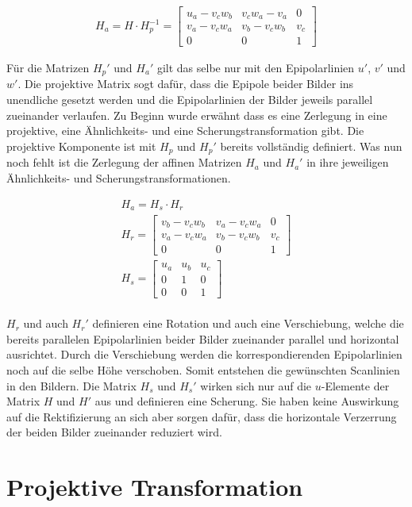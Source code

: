 \begin{gather}
	H_a= H \cdot H^{-1}_p = 
	\begin{bmatrix}
	u_a-v_cw_b&v_cw_a-v_a&0\\
	v_a-v_cw_a&v_b-v_cw_b&v_c\\
	0&0&1
	\end{bmatrix}
\end{gather}

Für die Matrizen $H_p'$ und $H_a'$ gilt das selbe nur mit den Epipolarlinien $u'$, $v'$ und $w'$.
Die projektive Matrix sogt dafür, dass die Epipole beider Bilder ins unendliche gesetzt werden und die Epipolarlinien der Bilder jeweils parallel zueinander verlaufen. Zu Beginn wurde erwähnt dass es eine Zerlegung in eine projektive, eine Ähnlichkeits- und eine Scherungstransformation gibt. Die projektive Komponente ist mit $H_p$ und $H_p'$ bereits vollständig definiert. Was nun noch fehlt ist die Zerlegung der affinen Matrizen $H_a$ und $H_a'$ in ihre jeweiligen Ähnlichkeits- und Scherungstransformationen. 

\begin{gather}
	H_a = H_s \cdot H_r\\
	H_r = 
	\begin{bmatrix}
	v_b-v_cw_b&	v_a-v_cw_a&0\\
	v_a-v_cw_a&v_b-v_cw_b&v_c\\
	0&0&1
	\end{bmatrix}\\
	H_s = 
	\begin{bmatrix}
	u_a&u_b&u_c\\
	0&1&0\\
	0&0&1
	\end{bmatrix}
\end{gather}\\

$H_r$ und auch $H_r'$ definieren eine Rotation und auch eine Verschiebung, welche die bereits parallelen Epipolarlinien beider Bilder zueinander parallel und horizontal ausrichtet. Durch die Verschiebung werden die korrespondierenden Epipolarlinien noch auf die selbe Höhe verschoben. Somit entstehen die gewünschten Scanlinien in den Bildern. Die Matrix $H_s$ und $H_s'$ wirken sich nur auf die $u$-Elemente der Matrix $H$ und $H'$ aus und definieren eine Scherung. Sie haben keine Auswirkung auf die Rektifizierung an sich aber sorgen dafür, dass die horizontale Verzerrung der beiden Bilder zueinander reduziert wird.\\

\section{Projektive Transformation}

